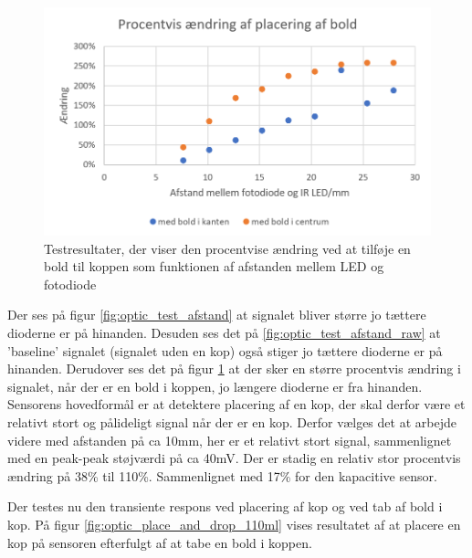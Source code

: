 \documentclass[HardwareDesign/HardwareDesign_main.tex]{subfiles}
\begin{document}
\begin{figure}[H]
    \centering
    \includegraphics[width=\textwidth]{HardwareDesign/CupSensor/graphics/OpticTest/beer_afstand_procent.PNG}
    \caption{Testresultater, der viser den procentvise ændring ved at tilføje en bold til koppen som funktionen af afstanden mellem LED og fotodiode}
    \label{fig:optic_test_afstand_procent}
\end{figure}

Der ses på figur \ref{fig:optic_test_afstand} at signalet bliver større jo tættere dioderne er på hinanden. Desuden ses det på \ref{fig:optic_test_afstand_raw} at 'baseline' signalet (signalet uden en kop) også stiger jo tættere dioderne er på hinanden. Derudover ses det på figur \ref{fig:optic_test_afstand_procent} at der sker en større procentvis ændring i signalet, når der er en bold i koppen, jo længere dioderne er fra hinanden. Sensorens hovedformål er at detektere placering af en kop, der skal derfor være et relativt stort og pålideligt signal når der er en kop. Derfor vælges det at arbejde videre med afstanden på ca 10mm, her er et relativt stort signal, sammenlignet med en peak-peak støjværdi på ca 40mV. Der er stadig en relativ stor procentvis ændring på 38\% til 110\%. Sammenlignet med 17\% for den kapacitive sensor.

Der testes nu den transiente respons ved placering af kop og ved tab af bold i kop. På figur \ref{fig:optic_place_and_drop_110ml} vises resultatet af at placere en kop på sensoren efterfulgt af at tabe en bold i koppen.
\end{document}
